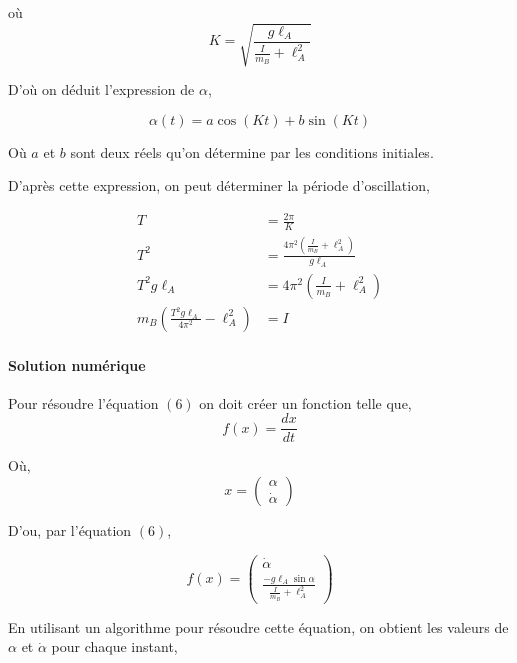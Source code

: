\documentclass[10pt]{article}
\begin{document}
où $$K = \sqrt{\frac{g\ell_A}{\frac{I}{m_B}+\ell_A^2}}$$

D'où on déduit l'expression de $\alpha$,

$$
\alpha(t) = a\cos{(Kt)}+b\sin{(Kt)} 
$$

Où $a$ et $b$ sont deux réels qu'on détermine par les conditions initiales.

D'après cette expression, on peut déterminer la période d'oscillation,

\begin{align*}
T &= \frac{2\pi}{K} \\
T^2 &= \frac{4\pi^2\left(\frac{I}{m_B}+\ell_A^2\right)}{g\ell_A} \\
T^2g\ell_A &= 4\pi^2\left(\frac{I}{m_B}+\ell_A^2\right) \\
m_B\left(\frac{T^2g\ell_A}{4\pi^2}-\ell_A^2\right) &= I
\end{align*}

\paragraph{Solution numérique}

Pour résoudre l'équation $(6)$ on doit créer un fonction telle que,
$$ f(x) = \frac{dx}{dt} $$

Où, $$x = \begin{pmatrix}
           \alpha \\ \dot{\alpha}
          \end{pmatrix}$$

D'ou, par l'équation $(6)$,

$$ f(x) = \begin{pmatrix}
           \dot{\alpha} \\
           \frac{-g\ell_A\sin{\alpha}}{\frac{I}{m_B} + \ell_A^2}
          \end{pmatrix}
$$

En utilisant un algorithme pour résoudre cette équation, on obtient les valeurs de $\alpha$ et $\dot{\alpha}$ pour chaque instant,
\end{document}
